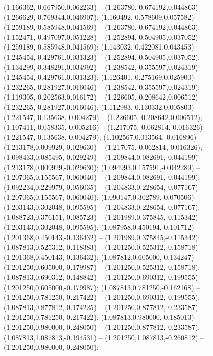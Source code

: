  (1.166362,-0.667950,0.062233) -- (1.263780,-0.674192,0.044863) -- (1.266629,-0.769344,0.046907);
 (1.160492,-0.578609,0.057582) -- (1.259189,-0.585948,0.041569) -- (1.263780,-0.674192,0.044863);
 (1.152471,-0.497097,0.051228) -- (1.252894,-0.504905,0.037052) -- (1.259189,-0.585948,0.041569);
 (1.143032,-0.422081,0.043453) -- (1.245454,-0.429761,0.031323) -- (1.252894,-0.504905,0.037052);
 (1.134299,-0.348291,0.034992) -- (1.238542,-0.355597,0.024319) -- (1.245454,-0.429761,0.031323);
 (1.126401,-0.275169,0.025900) -- (1.232265,-0.281927,0.016046) -- (1.238542,-0.355597,0.024319);
 (1.119305,-0.202563,0.016172) -- (1.226605,-0.208642,0.006512) -- (1.232265,-0.281927,0.016046);
 (1.112983,-0.130332,0.005803) -- (1.221547,-0.135638,-0.004279) -- (1.226605,-0.208642,0.006512);
 (1.107411,-0.058335,-0.005216) -- (1.217075,-0.062814,-0.016326) -- (1.221547,-0.135638,-0.004279);
 (1.102567,0.013564,-0.016896) -- (1.213178,0.009929,-0.029630) -- (1.217075,-0.062814,-0.016326);
 (1.098433,0.085495,-0.029249) -- (1.209844,0.082691,-0.044199) -- (1.213178,0.009929,-0.029630);
 (1.094993,0.157591,-0.042289) -- (1.207065,0.155567,-0.060040) -- (1.209844,0.082691,-0.044199);
 (1.092234,0.229979,-0.056035) -- (1.204833,0.228654,-0.077167) -- (1.207065,0.155567,-0.060040);
 (1.090147,0.302789,-0.070506) -- (1.203143,0.302048,-0.095595) -- (1.204833,0.228654,-0.077167);
 (1.088723,0.376151,-0.085723) -- (1.201989,0.375845,-0.115342) -- (1.203143,0.302048,-0.095595);
 (1.087958,0.450194,-0.101712) -- (1.201368,0.450143,-0.136432) -- (1.201989,0.375845,-0.115342);
 (1.087813,0.525312,-0.118383) -- (1.201250,0.525312,-0.158718) -- (1.201368,0.450143,-0.136432);
 (1.087812,0.605000,-0.134247) -- (1.201250,0.605000,-0.179987) -- (1.201250,0.525312,-0.158718);
 (1.087813,0.690312,-0.148842) -- (1.201250,0.690312,-0.199555) -- (1.201250,0.605000,-0.179987);
 (1.087813,0.781250,-0.162168) -- (1.201250,0.781250,-0.217422) -- (1.201250,0.690312,-0.199555);
 (1.087813,0.877812,-0.174225) -- (1.201250,0.877812,-0.233587) -- (1.201250,0.781250,-0.217422);
 (1.087813,0.980000,-0.185013) -- (1.201250,0.980000,-0.248050) -- (1.201250,0.877812,-0.233587);
 (1.087813,1.087813,-0.194531) -- (1.201250,1.087813,-0.260812) -- (1.201250,0.980000,-0.248050);
